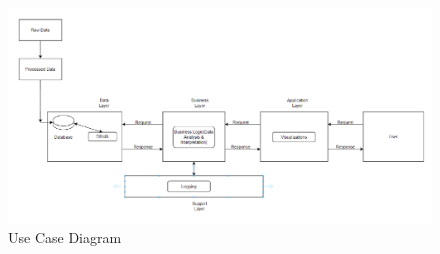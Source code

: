 \label{sec:architecture}
\begin{figure}
	\centering
	\includegraphics[width=1.2\linewidth]{images/system-architecture.png}
	\caption{Use Case Diagram}
\end{figure} 